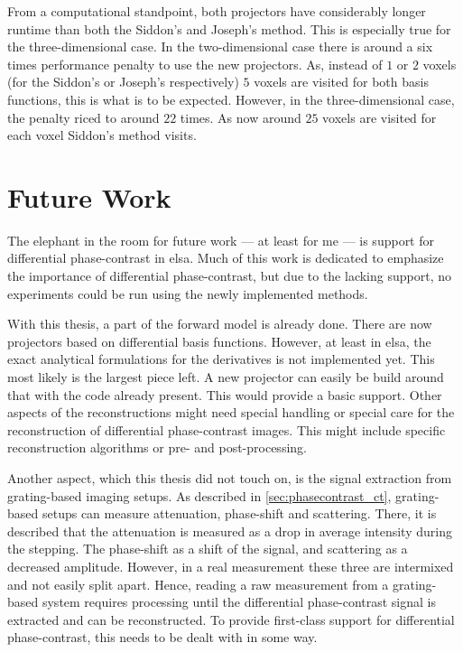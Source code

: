 From a computational standpoint, both projectors have considerably longer runtime than both the
Siddon's and Joseph's method. This is especially true for the three-dimensional case. In the
two-dimensional case there is around a six times performance penalty to use the new projectors. As,
instead of \(1\) or \(2\) voxels (for the Siddon's or Joseph's respectively) \(5\) voxels are
visited for both basis functions, this is what is to be expected. However, in the three-dimensional
case, the penalty riced to around \(22\) times. As now around \(25\) voxels are visited for each
voxel Siddon's method visits.

\chapter{Future Work}\label{chap:future_work}

The elephant in the room for future work --- at least for me --- is support for differential
phase-contrast in elsa. Much of this work is dedicated to emphasize the importance of differential
phase-contrast, but due to the lacking support, no experiments could be run using the newly
implemented methods.

With this thesis, a part of the forward model is already done. There are now projectors based on
differential basis functions. However, at least in elsa, the exact analytical formulations for the
derivatives is not implemented yet. This most likely is the largest piece left. A new projector can
easily be build around that with the code already present. This would provide a basic support. Other
aspects of the reconstructions might need special handling or special care for the reconstruction of
differential phase-contrast images. This might include specific reconstruction algorithms or pre-
and post-processing.

Another aspect, which this thesis did not touch on, is the signal extraction from grating-based
imaging setups. As described in \autoref{sec:phasecontrast_ct}, grating-based setups can measure
attenuation, phase-shift and scattering. There, it is described that the attenuation is measured as
a drop in average intensity during the stepping. The phase-shift as a shift of the signal, and
scattering as a decreased amplitude. However, in a real measurement these three are intermixed and
not easily split apart. Hence, reading a raw measurement from a grating-based system requires
processing until the differential phase-contrast signal is extracted and can be reconstructed. To
provide first-class support for differential phase-contrast, this needs to be dealt with in some
way.

